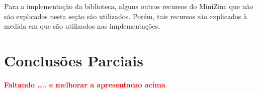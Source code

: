 Para a implementação da biblioteca, alguns outros recursos do MiniZinc que não são explicados nesta seção são utilizados. Porém, tais recursos são explicados à medida em que são utilizados nas implementações.




\section{Conclusões Parciais}
{\bf \textcolor{red}{Faltando .... e melhorar a apresentacao acima}}
